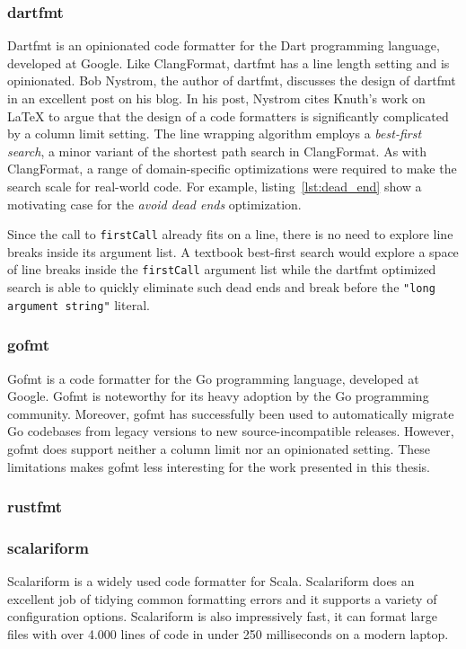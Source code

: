 \subsubsection{dartfmt}
Dartfmt\autocite{nystrom_dart_style_2014} is an opinionated code formatter for the Dart programming language, developed at Google.
Like ClangFormat, dartfmt has a line length setting and is opinionated.
Bob Nystrom, the author of dartfmt, discusses the design of dartfmt in an excellent post\autocite{nystrom_hardest_2015} on his blog.
In his post, Nystrom cites Knuth's work on \LaTeX{} to argue that the design of a code formatters is significantly complicated by a column limit setting.
The line wrapping algorithm employs a \emph{best-first search}\autocite{pearl_heuristics:_1984},
a minor variant of the shortest path search in ClangFormat.
As with ClangFormat, a range of domain-specific optimizations were required to make the search scale for real-world code.
For example, listing~\ref{lst:dead_end} show a motivating case for the \emph{avoid dead ends} optimization.

Since the call to \texttt{firstCall} already fits on a line, there is no need to explore line breaks inside its argument list.
A textbook best-first search would explore a space of line breaks inside the \texttt{firstCall} argument list while the dartfmt optimized search is able to quickly eliminate such dead ends and break before the \texttt{"long argument string"} literal.


\subsubsection{gofmt}
Gofmt\autocite{gofmt94:online} is a code formatter for the Go programming language, developed at Google.
Gofmt is noteworthy for its heavy adoption by the Go programming community.
Moreover, gofmt has successfully been used to automatically migrate Go codebases from legacy versions to new source-incompatible releases.
However, gofmt does support neither a column limit nor an opinionated setting.
These limitations makes gofmt less interesting for the work presented in this thesis.

\subsubsection{rustfmt}
\subsubsection{scalariform}
Scalariform\autocite{russell_scalariform_2010} is a widely used code formatter for Scala.
Scalariform does an excellent job of tidying common formatting errors and it supports a variety of configuration options.
Scalariform is also impressively fast, it can format large files with over 4.000 lines of code in under 250 milliseconds on a modern laptop.

